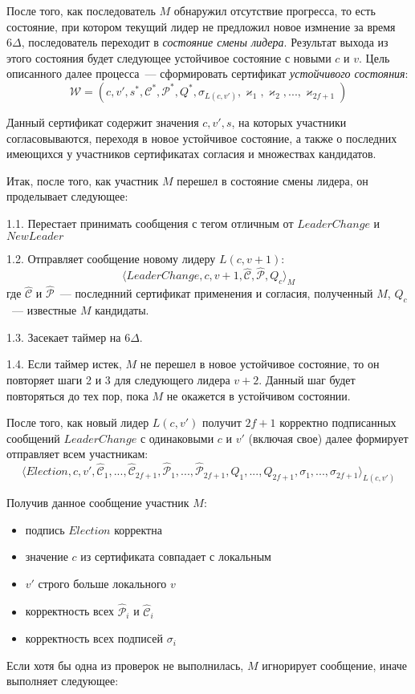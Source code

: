 После того, как последователь $M$ обнаружил отсутствие прогресса, то есть состояние, при котором текущий лидер не предложил новое измнение за время $6\Delta$, последователь переходит в \textit{состояние смены лидера}.
Результат выхода из этого состояния будет следующее устойчивое состояние с новыми $c$ и $v$.
Цель описанного далее процесса~--- сформировать сертификат \textit{устойчивого состояния}:
$$\mathcal{W}=(c, v', s^{*}, \mathcal{C}^{*}, \mathcal{P}^{*}, Q^{*}, \sigma_{L(c, v')}, \varkappa_1, \varkappa_2,..., \varkappa_{2f+1})$$

Данный сертификат содержит значения $c, v', s$, на которых участники согласовываются, переходя в новое устойчивое состояние, а также о последних имеющихся у участников сертификатах согласия и множествах кандидатов.

Итак, после того, как участник $M$ перешел в состояние смены лидера, он проделывает следующее:

1.1. Перестает принимать сообщения с тегом отличным от $LeaderChange$ и $NewLeader$

1.2. Отправляет сообщение новому лидеру $L(c, v+1)$:
\[ \langle LeaderChange, c, v+1,  \hat{\mathcal{C}}, \hat{\mathcal{P}}, Q_c \rangle_M \]
где $\hat{\mathcal{C}}$ и $\hat{\mathcal{P}}$~--- последнний сертификат применения и согласия, полученный $M$, $Q_c$~--- известные $M$ кандидаты.

1.3. Засекает таймер на $6\Delta$.

1.4. Если таймер истек, $M$ не перешел в новое устойчивое состояние, то он повторяет шаги 2 и 3 для следующего лидера $v+2$. Данный шаг будет повторяться до тех пор, пока $M$ не окажется в устойчивом состоянии.
\vspace{10pt}

После того, как новый лидер $L(c, v')$ получит $2f+1$ корректно подписанных сообщений $LeaderChange$ с одинаковыми $c$ и $v'$  (включая свое) далее формирует отправляет всем участникам:
\[ \langle Election, c, v', \hat{\mathcal{C}}_1,...,\hat{\mathcal{C}}_{2f+1}, \hat{\mathcal{P}}_1,...,\hat{\mathcal{P}}_{2f+1}, Q_1,..., Q_{2f+1}, \sigma_1,..., \sigma_{2f+1}\rangle_{L(c, v')} \]

Получив данное сообщение участник $M$:
\begin{itemize}
\item подпись $Election$ корректна
\item значение $c$ из сертификата совпадает с локальным
\item $v'$ строго больше локального $v$
\item корректность всех $\hat{\mathcal{P}}_i$ и $\hat{\mathcal{C}}_i$
\item корректность всех подписей $\sigma_i$
\end{itemize}
Если хотя бы одна из проверок не выполнилась, $M$ игнорирует сообщение, иначе выполняет следующее:

